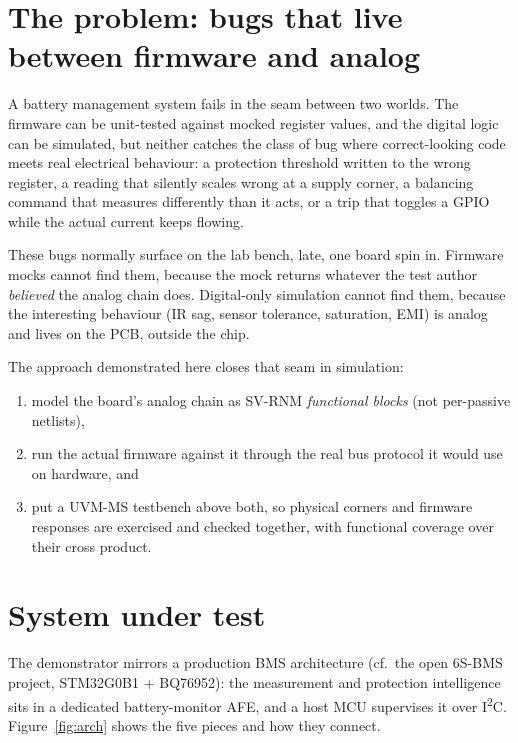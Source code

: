 \documentclass[11pt]{article}
\newcommand{\iic}{I\textsuperscript{2}C}
\begin{document}
\section{The problem: bugs that live between firmware and analog}

A battery management system fails in the seam between two worlds.  The
firmware can be unit-tested against mocked register values, and the
digital logic can be simulated, but neither catches the class of bug
where correct-looking code meets real electrical behaviour: a
protection threshold written to the wrong register, a reading that
silently scales wrong at a supply corner, a balancing command that
measures differently than it acts, or a trip that toggles a GPIO while
the actual current keeps flowing.

These bugs normally surface on the lab bench, late, one board spin in.
Firmware mocks cannot find them, because the mock returns whatever the
test author \emph{believed} the analog chain does.  Digital-only
simulation cannot find them, because the interesting behaviour (IR
sag, sensor tolerance, saturation, EMI) is analog and lives on the
PCB, outside the chip.

The approach demonstrated here closes that seam in simulation:
\begin{enumerate}
  \item model the board's analog chain as SV-RNM \emph{functional
        blocks} (not per-passive netlists),
  \item run the actual firmware against it through the real bus
        protocol it would use on hardware, and
  \item put a UVM-MS testbench above both, so physical corners and
        firmware responses are exercised and checked together, with
        functional coverage over their cross product.
\end{enumerate}

\section{System under test}

The demonstrator mirrors a production BMS architecture (cf.\ the open
6S-BMS project, STM32G0B1 + BQ76952): the measurement and protection
intelligence sits in a dedicated battery-monitor AFE, and a host MCU
supervises it over \iic{}.  Figure~\ref{fig:arch} shows the five
pieces and how they connect.
\end{document}
